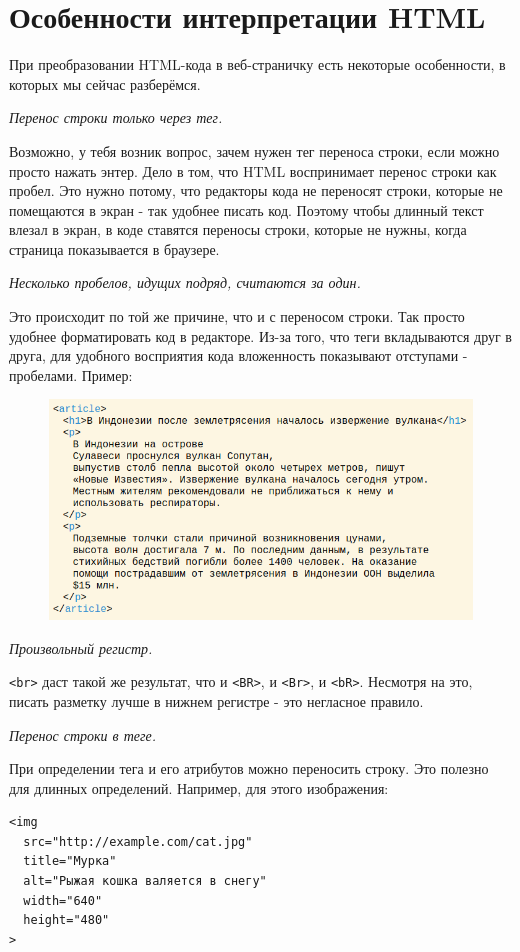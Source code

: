 \documentclass[14pt]{extreport}
\begin{document}
\section{Особенности интерпретации HTML}
При преобразовании HTML-кода в веб-страничку есть некоторые особенности, в которых мы сейчас разберёмся.

\emph{Перенос строки только через тег.}

Возможно, у тебя возник вопрос, зачем нужен тег переноса строки, если можно просто нажать энтер. Дело в том, что HTML воспринимает перенос строки как пробел. Это нужно потому, что редакторы кода не переносят﻿ строки, которые не помещаются в экран - так удобнее писать код. Поэтому чтобы длинный текст влезал в экран, в коде ставятся переносы строки, которые не нужны, когда страница показывается в браузере.

\emph{Несколько пробелов, идущих подряд, считаются за один.}

Это происходит по той же причине, что и с переносом строки. Так просто удобнее форматировать код в редакторе. Из-за того, что теги вкладываются друг в друга, для удобного восприятия кода вложенность показывают отступами - пробелами. Пример:

\begin{figure}[H]
\centerline{\includegraphics[width=1.0\linewidth]{pics_practice/interpretation_HTML.png}}
\caption{}
\label{}
\end{figure}

\emph{Произвольный регистр.}

\texttt{<br>} даст такой же результат, что и \texttt{<BR>}, и \texttt{<Br>}, и \texttt{<bR>}. Несмотря на это, писать разметку лучше в нижнем регистре - это негласное правило.

\emph{Перенос строки в теге.}

При определении тега и его атрибутов можно переносить строку. Это полезно для длинных определений.
Например, для этого изображения:
\begin{verbatim}
<img
  src="http://example.com/cat.jpg"
  title="Мурка"
  alt="Рыжая кошка валяется в снегу"
  width="640"
  height="480"
>
\end{verbatim}
\end{document}
